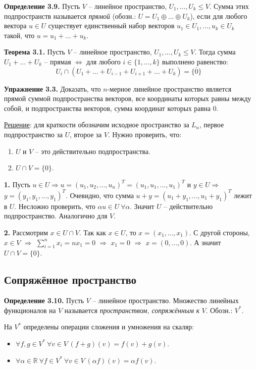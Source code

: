 \documentclass[a4paper, 12pt]{article}
\begin{document}
\begin{spacing}{1.5}
\textbf{Определение 3.9.} Пусть $V$ -- линейное пространство, $U_1, ..., U_k \leq V$. Сумма этих подпространств называется \textit{прямой} (обозн.: $U = U_1 \oplus ... \oplus U_k$), если для любого вектора $u \in U$ существует единственный набор векторов $u_1 \in U_1, ..., u_k \in U_k$ такой, что $u = u_1 + ... + u_k$.

\textbf{Теорема 3.1.} Пусть $V$ -- линейное пространство, $U_1, ..., U_k \leq V$. Тогда сумма $U_1 + ... + U_k$ -- прямая $\Leftrightarrow$ для любого $i \in \{1, ..., k \}$ выполнено равенство:
$$U_i \cap (U_1 + ... + U_{i-1} + U_{i+1} + ... + U_k) = \{ \overline{0} \}$$

\textbf{Упражнение 3.3.} Доказать, что $n$-мерное линейное пространство является прямой суммой подпространства векторов, все координаты которых равны между собой, и подпространства векторов, сумма координат которых равна $0$.

\underline{Решение}: для краткости обозначим исходное пространство за $L_n$, первое подпространство за $U$, второе за $V$. Нужно проверить, что:
\begin{enumerate}[noitemsep]
    \item $U$ и $V$ -- это действительно подпространства.
    \item $U \cap V = \{ 0 \}$.
\end{enumerate}

\textbf{1.} Пусть $u \in U \Rightarrow u = (u_1, u_2, ..., u_n)^T = (u_1, u_1, ..., u_1)^T$ и $y \in U \Rightarrow$ $y = (y_1, y_1, ..., y_1)^T$. Очевидно, что сумма $u + y = (u_1 + y_1, ..., u_1 + y_1)^T$ лежит в $U$. Несложно проверить, что $\alpha u \in U \ \forall \alpha$. Значит $U$ -- действительно подпространство. Аналогично для $V$.

\textbf{2.} Рассмотрим $x \in U \cap V$. Так как $x \in U$, то $x = (x_1, ..., x_1)$. С другой стороны, $x \in V$ $\Rightarrow$ $\sum_{i=1}^n x_i = n x_1 = 0$ $\Rightarrow$ $x_1 = 0$ $\Rightarrow$ $x = (0, ..., 0)$. А значит $U \cap V = \{ 0 \}$.


\subsection*{Сопряжённое пространство}

\textbf{Определение 3.10.} Пусть $V$ -- линейное пространство. Множество линейных функционалов на $V$ называется \textit{пространством, сопряжённым к} $V$. Обозн.: $V^*$.

На $V^*$ определены операции сложения и умножения на скаляр:
\begin{itemize}[noitemsep]
    \item $\forall f, g \in V^* \ \forall v \in V \ (f+g)(v) = f(v) + g(v)$.
    \item $\forall \alpha \in \mathbb{R} \ \forall f \in V^* \ \forall v \in V \ (\alpha f)(v) = \alpha f(v)$.
\end{itemize}


\end{spacing}
\end{document}
